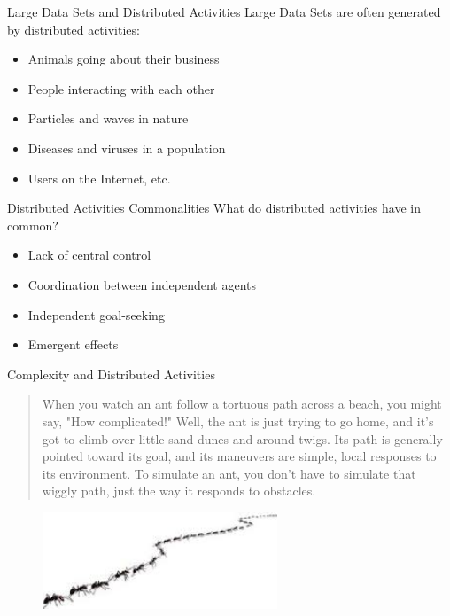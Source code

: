 \documentclass[handout]{beamer}
\begin{document}
\begin{frame}{Large Data Sets and Distributed Activities}
Large Data Sets are often generated by distributed activities:
	\begin{itemize}
	\item Animals going about their business
	\item People interacting with each other
	\item Particles and waves in nature
	\item Diseases and viruses in a population
	\item Users on the Internet, etc.
	\end{itemize}
\end{frame}

\begin{frame}{Distributed Activities Commonalities}
What do distributed activities have in common?
	\begin{itemize}
	\item Lack of central control
	\item Coordination between independent agents
	\item Independent goal-seeking
	\item Emergent effects
	\end{itemize}
\end{frame}

\begin{frame}{Complexity and Distributed Activities}
\begin{quote}
 When you watch an ant follow a tortuous path across a beach, you might say, "How complicated!" Well, the ant is just trying to go home, and it's got to climb over little sand dunes and around twigs. Its path is generally pointed toward its goal, and its maneuvers are simple, local responses to its environment. To simulate an ant, you don't have to simulate that wiggly path, just the way it responds to obstacles. 
\end{quote}
\citep{simon1994thinking} \citep{simon1996sciences}

\pause
\begin{figure}
\begin{center}
 \includegraphics[width=7cm]{images/antTrail02.jpg}
   \caption{}
  \label{fig:antTrail}
\end{center}
\end{figure}

\end{frame}
\end{document}
